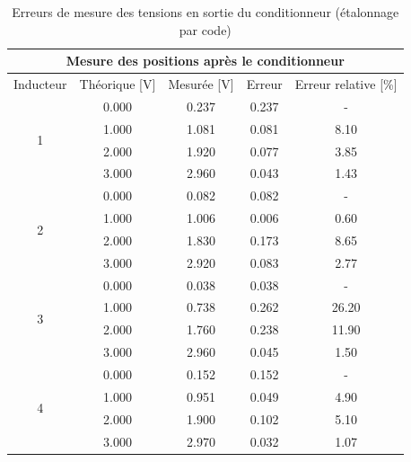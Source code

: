 \begin{table}[H]
    \centering
    \begin{tabular}{|c|c|c|c|c|}
        \hline
        \multicolumn{5}{|c|}{\textbf{Mesure des positions après le conditionneur}}                   \\ \hline
        Inducteur          & Théorique {[}V{]} & Mesurée {[}V{]} & Erreur & Erreur relative {[}\%{]} \\ \hline
        \multirow{4}{*}{1} & 0.000             & 0.237           & 0.237  & -                        \\ \cline{2-5}
                           & 1.000             & 1.081           & 0.081  & 8.10                     \\ \cline{2-5}
                           & 2.000             & 1.920           & 0.077  & 3.85                     \\ \cline{2-5}
                           & 3.000             & 2.960           & 0.043  & 1.43                     \\ \hline
        \multirow{4}{*}{2} & 0.000             & 0.082           & 0.082  & -                        \\ \cline{2-5}
                           & 1.000             & 1.006           & 0.006  & 0.60                     \\ \cline{2-5}
                           & 2.000             & 1.830           & 0.173  & 8.65                     \\ \cline{2-5}
                           & 3.000             & 2.920           & 0.083  & 2.77                     \\ \hline
        \multirow{4}{*}{3} & 0.000             & 0.038           & 0.038  & -                        \\ \cline{2-5}
                           & 1.000             & 0.738           & 0.262  & 26.20                    \\ \cline{2-5}
                           & 2.000             & 1.760           & 0.238  & 11.90                    \\ \cline{2-5}
                           & 3.000             & 2.960           & 0.045  & 1.50                     \\ \hline
        \multirow{4}{*}{4} & 0.000             & 0.152           & 0.152  & -                        \\ \cline{2-5}
                           & 1.000             & 0.951           & 0.049  & 4.90                     \\ \cline{2-5}
                           & 2.000             & 1.900           & 0.102  & 5.10                     \\ \cline{2-5}
                           & 3.000             & 2.970           & 0.032  & 1.07                     \\ \hline
    \end{tabular}
    \caption{Erreurs de mesure des tensions en sortie du conditionneur (étalonnage par code)}
    \label{tab:premier_etalonnage_code_cond}
\end{table}

